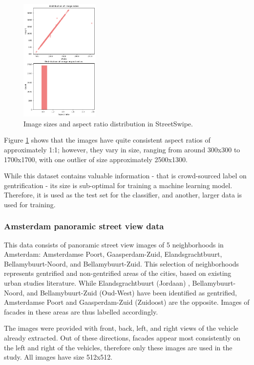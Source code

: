 \begin{figure}[H]
    \centering
    \includegraphics[width=0.35\textwidth]{media/methodology/SS_size_ar.png}
    \caption{Image sizes and aspect ratio distribution in StreetSwipe.}
    \label{fig:SS_size_ar}
\end{figure}

Figure \ref{fig:SS_size_ar} shows that the images have quite consistent aspect ratios of approximately 1:1; however, they vary in size, ranging from around 300x300 to 1700x1700, with one outlier of size approximately 2500x1300.

While this dataset contains valuable information - that is crowd-sourced label on gentrification - its size is sub-optimal for training a machine learning model. Therefore, it is used as the test set for the classifier, and another, larger data is used for training.

\subsubsection{Amsterdam panoramic street view data}
This data consists of panoramic street view images of 5 neighborhoods in Amsterdam: Amsterdamse Poort, Gaasperdam-Zuid, Elandsgrachtbuurt, Bellamybuurt-Noord, and Bellamybuurt-Zuid. This selection of neighborhoods represents gentrified and non-gentrified areas of the cities, based on existing urban studies literature. While Elandsgrachtbuurt (Jordaan) \cite{verlaan_hippies_2022}, Bellamybuurt-Noord, and Bellamybuurt-Zuid (Oud-West) \cite{rettberg_when_2019} have been identified as gentrified, Amsterdamse Poort and Gaasperdam-Zuid (Zuidoost) \cite{pinkster_stickiness_2020} are the opposite. Images of facades in these areas are thus labelled accordingly.

The images were provided with front, back, left, and right views of the vehicle already extracted. Out of these directions, facades appear most consistently on the left and right of the vehicles, therefore only these images are used in the study. All images have size 512x512.

